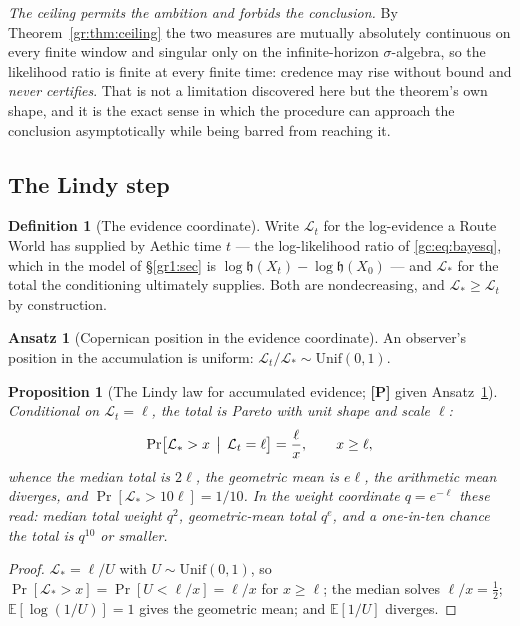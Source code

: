 \documentclass[11pt]{article}
\numberwithin{equation}{section}
\theoremstyle{plain}
\newtheorem{proposition}[theorem]{Proposition}
\theoremstyle{definition}
\newtheorem{definition}[theorem]{Definition}
\newtheorem{ansatz}[theorem]{Ansatz}
\theoremstyle{remark}
\newcommand{\E}{\mathbb{E}}
\newcommand{\Lc}{\mathcal{L}}
\newcommand{\hm}{\mathfrak{h}}
\begin{document}
\emph{The ceiling permits the ambition and forbids the conclusion.} By
Theorem~\ref{gr:thm:ceiling} the two measures are mutually absolutely
continuous on every finite window and singular only on the
infinite-horizon $\sigma$-algebra, so the likelihood ratio is finite at
every finite time: credence may rise without bound and \emph{never
certifies}. That is not a limitation discovered here but the theorem's
own shape, and it is the exact sense in which the procedure can approach
the conclusion asymptotically while being barred from reaching it.

\subsection{The Lindy step}\label{gc:sub:lindy}

\begin{definition}[The evidence coordinate]\label{gc:def:evidence}
Write $\Lc_t$ for the log-evidence a Route World has supplied by Aethic
time $t$ --- the log-likelihood ratio of \eqref{gc:eq:bayesq}, which in
the model of \S\ref{gr1:sec} is $\log\hm(X_t)-\log\hm(X_0)$ --- and
$\Lc_\ast$ for the total the conditioning ultimately supplies. Both are
nondecreasing, and $\Lc_\ast\ge\Lc_t$ by construction.
\end{definition}

\begin{ansatz}[Copernican position in the evidence coordinate]
\label{gc:ans:copernican}
An observer's position in the accumulation is uniform:
$\Lc_t/\Lc_\ast\sim\mathrm{Unif}(0,1)$.
\end{ansatz}

\begin{proposition}[The Lindy law for accumulated evidence;
\textbf{[P]} given Ansatz~\ref{gc:ans:copernican}]\label{gc:prop:lindy}
Conditional on $\Lc_t=\ell$, the total is Pareto with unit shape and
scale $\ell$:
\begin{equation}\label{gc:eq:lindylaw}
\Pr\bigl[\Lc_\ast>x\,\bigm|\,\Lc_t=\ell\bigr]=\frac{\ell}{x},
\qquad x\ge\ell,
\end{equation}
whence the median total is $2\ell$, the geometric mean is $e\ell$, the
arithmetic mean diverges, and $\Pr[\Lc_\ast>10\ell]=1/10$. In the
weight coordinate $q=e^{-\ell}$ these read: median total weight $q^{2}$,
geometric-mean total $q^{e}$, and a one-in-ten chance the total is
$q^{10}$ or smaller.
\end{proposition}

\begin{proof}
$\Lc_\ast=\ell/U$ with $U\sim\mathrm{Unif}(0,1)$, so
$\Pr[\Lc_\ast>x]=\Pr[U<\ell/x]=\ell/x$ for $x\ge\ell$; the median solves
$\ell/x=\tfrac12$; $\E[\log(1/U)]=1$ gives the geometric mean; and
$\E[1/U]$ diverges.
\end{proof}
\end{document}

